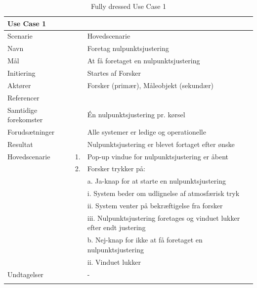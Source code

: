 \begin{longtabu} to  %
	{\large \textbf{Use Case 1}} && \\
	\toprule
	Scenarie 				&&	Hovedscenarie\\
	Navn 					&& 	Foretag nulpunktsjustering\\
	Mål 					&& 	At få foretaget en nulpunktsjustering\\
	Initiering 				&& 	Startes af Forsker\\
	Aktører 				&& 	Forsker (primær), Måleobjekt (sekundær)\\
	Referencer 				&& 	\\
	Samtidige forekomster  	&& 	Én nulpunktsjustering pr. kørsel \\
	Forudsætninger 			&&	Alle systemer er ledige og operationelle\\ 
	Resultat 				&& 	Nulpunktsjustering er blevet fortaget efter ønske\\ \midrule
	Hovedscenarie 			&    1. 	&	Pop-up vindue for nulpunktsjustering er åbent\\				 	
							&    2. 	& 	Forsker trykker på:\\ 
							& 			&	a. Ja-knap for at starte en nulpunktsjustering\\[-1ex]
							& 			&		 i. System beder om udlignelse af atmosfærisk tryk\\[-1ex]
							& 			&		 ii. System venter på bekræftigelse fra forsker\\[-1ex]
							& 			&		 iii. Nulpunktsjustering foretages og vinduet lukker efter endt justering\\[-1ex]
							& 			&  	b. Nej-knap for ikke at få foretaget en nulpunktsjustering\\[-1ex]
							& 			&   ii. Vinduet lukker\\[-1ex]	
	Undtagelser 			&			& 	-  \\ \bottomrule
	
	\caption{Fully dressed Use Case 1}
	\label{UC1}
\end{longtabu}


